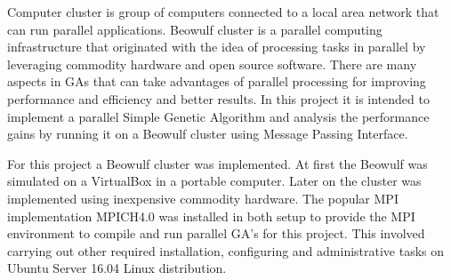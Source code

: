 Computer cluster is group of computers connected to a local area network that can run parallel applications. Beowulf cluster is a parallel computing infrastructure that originated with the idea of processing tasks in parallel by leveraging commodity hardware and open source software. There are many aspects in GAs that can take advantages of parallel processing for improving performance and efficiency and better results. In this project it is intended to implement a parallel Simple Genetic Algorithm and analysis the performance gains by running it on a Beowulf cluster using Message Passing Interface.

For this project a Beowulf cluster was implemented. At first the Beowulf was simulated on a VirtualBox in a portable computer. Later on the cluster was implemented using inexpensive commodity hardware. The popular MPI implementation MPICH4.0 was installed in both setup to provide the MPI environment to compile and run parallel GA's for this project. This involved carrying out other required installation, configuring and administrative tasks on Ubuntu Server 16.04 Linux distribution.  
 